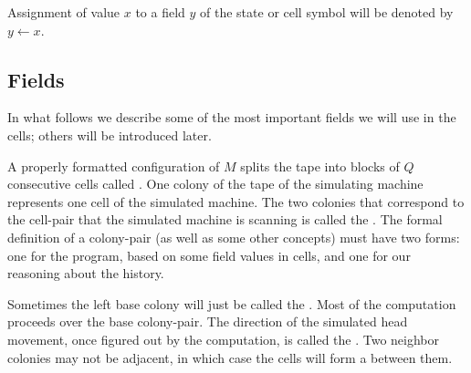 \documentclass[11pt]{memoir}
\theoremstyle{definition} %
\newcommand{\fld}[1]{\ensuremath{\textit{#1\/}}}
\newcommand{\Q}{Q} %
\newcommand{\increment}[1]{#1\mathord{+}\mathord{+}}
\newcommand{\decrement}[1]{#1\mathord{-}\mathord{-}}
\newcommand{\Addr}{\fld{Addr}}
\newcommand{\Drift}{\fld{Drift}}
\newcommand{\Hold}{\fld{Hold}}
\begin{document}
Assignment of value \( x \) to a field \( y \) of the state or cell symbol will
be denoted by \( y \gets x \).



\subsection{Fields}\label{sec:fields}



In what follows we describe some of the most important fields we will use in the cells;
others will be introduced later.

A properly formatted configuration of \( M \) splits the tape into blocks of \( \Q \)
consecutive cells called .
One colony of the tape of the simulating
machine represents one cell of the simulated machine.
The two colonies that correspond to the cell-pair that the
simulated machine is scanning is called the .
The formal definition of a colony-pair (as well as some other concepts) must have two
forms: one for the program, based on some field values in cells,
and one for our reasoning about the history.

Sometimes the left base colony will just be called the .
Most of the computation proceeds over the base colony-pair.
The direction of the simulated head movement, once figured out by the computation,
is called the .
Two neighbor colonies may not be adjacent, in which case the cells will form
a  between them.
\end{document}

